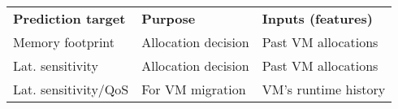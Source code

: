 
\setlength{\tabcolsep}{3pt}

\begin{table}[t!]
\begin{center}
\small
\begin{tabular}{p{2.8cm}p{2.5cm}p{2.8cm}}
\hline
\textbf{Prediction target}   & \textbf{Purpose}    & \textbf{Inputs (features)} \\
Memory footprint             & Allocation decision & Past VM allocations        \\
Lat. sensitivity             & Allocation decision & Past VM allocations        \\
Lat. sensitivity/QoS & For VM migration    & VM’s runtime history      \\
\hline
\end{tabular}
\end{center}
%
\vminfifteen
%
%
\vminfifteen
\end{table}
